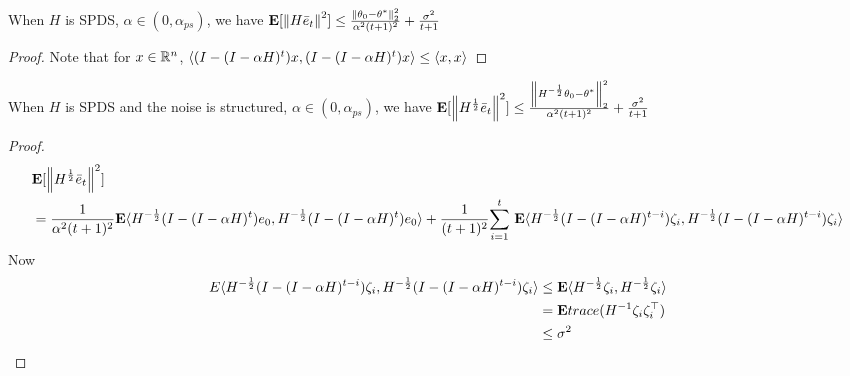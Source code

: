 \begin{theorem}\label{spdsaus}
When $H$ is SPDS, $\alpha \in (0,\alpha_{ps})$, we have
$\E[\norm{H\eb_t}^2]\leq \frac{\norm{\theta_0-\ts}^2_2}{\alpha^2(t+1)^2}+\frac{\sigma^2}{t+1}$
\end{theorem}
\begin{proof}
Note that for $x\in \R^n$, $\ip{(I-(I-\alpha H)^t)x,(I-(I-\alpha H)^t)x}\leq \ip{x,x}$
\end{proof}

\begin{theorem}\label{spdsas}
When $H$ is SPDS and the noise is structured, $\alpha \in (0,\alpha_{ps})$, we have
$\E[\norm{H^{\frac{1}{2}}\eb_t}^2]\leq \frac{\norm{H^{-\frac{1}{2}}\theta_0-\ts}^2_2}{\alpha^2(t+1)^2}+\frac{\sigma^2}{t+1}$
\end{theorem}
\begin{proof}
\begin{align*}
&\E[\norm{H^{\frac{1}{2}}\eb_t}^2]\\
&=\frac{1}{\alpha^2(t+1)^2}\E\ip{H^{-\frac{1}{2}}(I-(I-\alpha H)^t)e_0,H^{-\frac{1}{2}}(I-(I-\alpha H)^t)e_0}+\frac{1}{(t+1)^2}\ous{\sum}{i=1}{t}\E\ip{H^{-\frac{1}{2}}(I-(I-\alpha H)^{t-i}) \zeta_i,H^{-\frac{1}{2}}(I-(I-\alpha H)^{t-i}) \zeta_i}
\end{align*}
Now
\begin{align*}
E\ip{H^{-\frac{1}{2}}(I-(I-\alpha H)^{t-i}) \zeta_i,H^{-\frac{1}{2}}(I-(I-\alpha H)^{t-i}) \zeta_i}&\leq \E\ip{H^{-\frac{1}{2}}\zeta_i,H^{-\frac{1}{2}}\zeta_i}\\
&=\E trace(H^{-1}\zeta_i\zeta_i^\top)\\
&\leq \sigma^2
\end{align*}
\end{proof}


